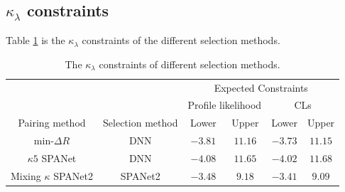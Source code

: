 \documentclass[12pt]{article}
\begin{document}
	\subsection{\texorpdfstring{$\kappa_\lambda$}{kappa} constraints}%
	\label{sub:kappa_constraints}
		Table \ref{tab:kappa_constraint_summary} is the $\kappa_\lambda$ constraints of the different selection methods.
		\begin{table}[htpb]
			\centering
			\caption{The $\kappa_\lambda$ constraints of different selection methods.}
			\label{tab:kappa_constraint_summary}
			\begin{tabular}{cc|cc|cc}
									&                  & \multicolumn{4}{c}{Expected Constraints}                         \\
									&                  & \multicolumn{2}{c}{Profile likelihood} & \multicolumn{2}{c}{CLs} \\ \hline
			Pairing method          & Selection method & Lower              & Upper             & Lower       & Upper     \\ \hline
			$\text{min-}\Delta R$   & DNN              & $-3.81$            & $11.16$           & $-3.73$     & $11.15$   \\
			$\kappa 5$ SPANet       & DNN              & $-4.08$            & $11.65$           & $-4.02$     & $11.68$   \\
			Mixing $\kappa$ SPANet2 & SPANet2          & $-3.48$            & $9.18$            & $-3.41$     & $9.09$   
			\end{tabular}		
		\end{table}


\end{document}
